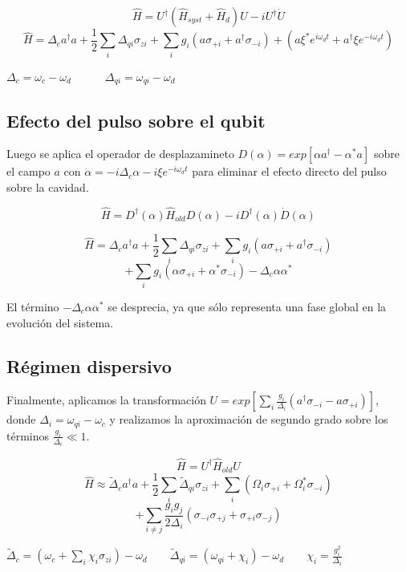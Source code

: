 $$\hat{H} = U^\dagger (\hat{H}_{syst} + \hat{H}_d) U - i U^\dagger \dot{U}$$
$$ \hat{H} = \Delta_c a^\dagger a + \frac{1}{2} \sum\limits_i \Delta_{qi} \sigma_{zi} + \sum\limits_i g_i (a \sigma_{+ i} + a^\dagger \sigma_{- i}) + (a\xi^*e^{i\omega_d t}+a^\dagger\xi e^{-i\omega_d t})$$

$\Delta_c = \omega_c - \omega_d \qquad \quad \Delta_{qi} = \omega_{qi} - \omega_d$

\subsection{Efecto del pulso sobre el qubit}

Luego se aplica el operador de desplazamineto $D(\alpha) = exp[\alpha a^\dagger - \alpha^* a]$ sobre el campo $a$ con $\dot{\alpha} = -i \Delta_c \alpha -i \xi e^{-i \omega_d t}$ para eliminar el efecto directo del pulso sobre la cavidad.

$$\hat{H} = D^\dagger (\alpha) \hat{H}_{old} D(\alpha) -i D^\dagger(\alpha) \dot{D}(\alpha)$$

$$\hat{H} = \Delta_c a^\dagger a + \frac{1}{2} \sum\limits_i \Delta_{qi} \sigma_{zi} + \sum\limits_i g_i (a \sigma_{+i} + a^\dagger \sigma_{-i})$$
$$ + \sum\limits_i g_i (\alpha \sigma_{+i} + \alpha^* \sigma_{-i}) - \Delta_c \alpha \alpha^* $$

El término $-\Delta_c \alpha \alpha^*$ se desprecia, ya que sólo representa una fase global en la evolución del sistema.

\subsection{Régimen dispersivo}

Finalmente, aplicamos la transformación $U = exp[\sum\limits_i \frac{g_i} {\Delta_i} (a^\dagger \sigma_{-i} - a \sigma_{+i})]$, donde $\Delta_i = \omega_{qi} - \omega_c$ y realizamos la aproximación de segundo grado sobre los términos $\frac{g_i}{\Delta_i} \ll 1$.

$$\hat{H} = U^\dagger \hat{H}_{old} U$$
$$\hat{H} \approx \tilde{\Delta}_c a^\dagger a + \frac{1}{2} \sum\limits_i \tilde{\Delta}_{qi} \sigma_{zi} + \sum\limits_i (\Omega_i \sigma_{+i} + \Omega_i^* \sigma_{-i})$$
$$+ \sum\limits_{i \neq j} \frac{g_i g_j}{2 \Delta_i} (\sigma_{-i} \sigma_{+j}+\sigma_{+i} \sigma_{-j})$$

$\tilde{\Delta}_c = (\omega_c + \sum\limits_i \chi_i \sigma_{zi}) - \omega_d
 \qquad
 \tilde{\Delta}_{qi} = (\omega_{qi} + \chi_i) - \omega_d
 \qquad
 \chi_i = \frac{g_i^2}{\Delta_i}$

